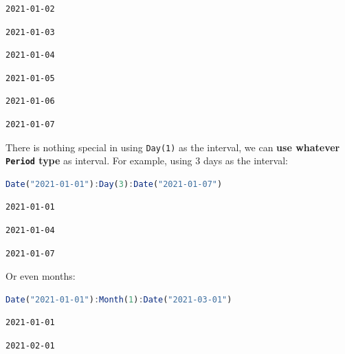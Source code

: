 \documentclass[
  notoc %
]{tufte-book}
\newcommand{\passthrough}[1]{#1}
\begin{document}
\begin{lstlisting}[language=Output]
2021-01-02
\end{lstlisting}

\begin{lstlisting}[language=Output]
2021-01-03
\end{lstlisting}

\begin{lstlisting}[language=Output]
2021-01-04
\end{lstlisting}

\begin{lstlisting}[language=Output]
2021-01-05
\end{lstlisting}

\begin{lstlisting}[language=Output]
2021-01-06
\end{lstlisting}

\begin{lstlisting}[language=Output]
2021-01-07
\end{lstlisting}

There is nothing special in using \passthrough{\lstinline!Day(1)!} as
the interval, we can \textbf{use whatever
\passthrough{\lstinline!Period!} type} as interval. For example, using 3
days as the interval:

\begin{lstlisting}[language=Julia]
Date("2021-01-01"):Day(3):Date("2021-01-07")
\end{lstlisting}

\begin{lstlisting}[language=Output]
2021-01-01
\end{lstlisting}

\begin{lstlisting}[language=Output]
2021-01-04
\end{lstlisting}

\begin{lstlisting}[language=Output]
2021-01-07
\end{lstlisting}

Or even months:

\begin{lstlisting}[language=Julia]
Date("2021-01-01"):Month(1):Date("2021-03-01")
\end{lstlisting}

\begin{lstlisting}[language=Output]
2021-01-01
\end{lstlisting}

\begin{lstlisting}[language=Output]
2021-02-01
\end{lstlisting}
\end{document}
